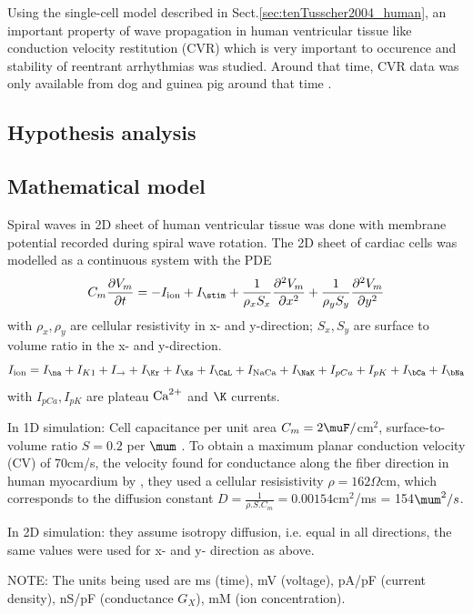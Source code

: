 Using the single-cell model described in Sect.\ref{sec:tenTusscher2004_human},
an important property of wave propagation in human ventricular tissue like
conduction velocity restitution (CVR) which is very important to occurence and
stability of reentrant arrhythmias \citep{qu1999} was studied.
Around that time, CVR data was only available from dog and guinea pig around
that time \citep{cao1999,girouard1996}.

\subsection{Hypothesis analysis}


\subsection{Mathematical model }

Spiral waves in 2D sheet of human ventricular tissue was done with membrane
potential recorded during spiral wave rotation. The 2D sheet of cardiac cells
was modelled as a continuous system with the PDE
\begin{equation}
C_m\frac{\partial V_m}{\partial t} = -I_\ion + I_\stim + \frac{1}{\rho_x S_x}
\frac{\partial^2 V_m}{\partial x^2} + \frac{1}{\rho_y S_y}
\frac{\partial^2 V_m}{\partial y^2} 
\end{equation}
with $\rho_x,\rho_y$ are cellular resistivity in x- and y-direction; $S_x,S_y$
are surface to volume ratio in the x- and y-direction. 
\begin{equation}
I_\ion = I_\na + I_{K1} + I_\to + I_\Kr + I_\Ks + I_\CaL + I_\NaCa + I_\NaK +
I_{pCa} + I_{pK} + I_\bCa + I_\bNa 
\end{equation}
with $I_{pCa},I_{pK}$ are plateau ${\text{Ca}^{2+}}$ and $\K$ currents.

In 1D simulation: Cell capacitance per unit area $C_m=2\muF/$cm$^2$,
surface-to-volume ratio $S=0.2$ per $\mum$ \citep{bernus2002}. 
To obtain a maximum planar conduction velocity (CV) of 70cm/s, the velocity
found for conductance along the fiber direction in human myocardium by
\citep{taggart2000}, they used a cellular resisistivity $\rho=162\Omega$cm,
which corresponds to the diffusion constant
$D=\frac{1}{\rho.S.C_m}=0.00154$cm$^2$/ms = 154$\mum^2/s$.

In 2D simulation: they assume isotropy diffusion, i.e. equal in all directions,
the same values were used for x- and y- direction as above. 


NOTE: The units being used are ms (time), mV (voltage), pA/pF (current density),
nS/pF (conductance $G_X$), mM (ion concentration). 

